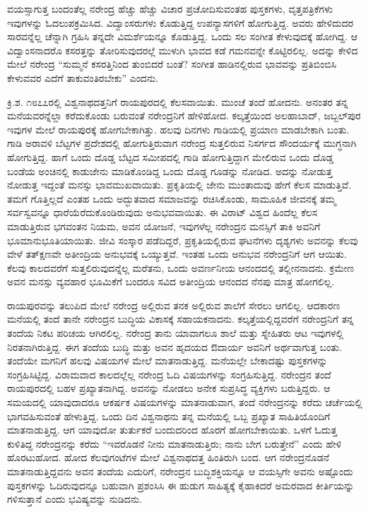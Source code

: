 ವಯಸ್ಸಾಗುತ್ತ ಬಂದಂತೆಲ್ಲ ನರೇಂದ್ರ ಹೆಚ್ಚು ಹೆಚ್ಚು ವಿಚಾರ ಪ್ರಚೋದಿಸುವಂತಹ ಪುಸ್ತಕಗಳು, ವೃತ್ತಪತ್ರಿಕೆಗಳು ಇವುಗಳನ್ನು ಓದಲುಪಕ್ರಮಿಸಿದ. ವಿದ್ವಾಂಸರುಗಳು ಕೊಡುತ್ತಿದ್ದ ಉಪನ್ಯಾಸಗಳಿಗೆ ಹೋಗುತ್ತಿದ್ದ. ಅವರು ಹೇಳಿದುದರ ಸಾರವನ್ನೆಲ್ಲ ಚೆನ್ನಾಗಿ ಗ್ರಹಿಸಿ ತನ್ನದೇ ವಿಮರ್ಶೆಯನ್ನೂ ಕೊಡುತ್ತಿದ್ದ. ಒಂದು ಸಲ ಸಂಗೀತ ಕೇಳುವುದಕ್ಕೆ ಹೋಗಿದ್ದ. ಆ ವಿದ್ವಾಂಸನಾದರೊ ಕಸರತ್ತನ್ನು ತೋರಿಸುವುದರಲ್ಲೆ ಮುಳುಗಿ ಭಾವದ ಕಡೆ ಗಮನವನ್ನೇ ಕೊಟ್ಟಿರಲಿಲ್ಲ. ಅದನ್ನು ಕೇಳಿದ ಮೇಲೆ ನರೇಂದ್ರ “ಸುಮ್ಮನೆ ಕಸರತ್ತಿನಿಂದ ತುಂಬಿದರೆ ಬಂತೆ? ಸಂಗೀತ ಹಾಡಿನಲ್ಲಿರುವ ಭಾವವನ್ನು ಪ್ರತಿಬಿಂಬಿಸಿ ಕೇಳುವವರ ಎದೆಗೆ ತಾಕುವಂತಿರಬೇಕು” ಎಂದನು.

ಕ್ರಿ.ಶ. ೧೮೭೭ರಲ್ಲಿ ವಿಶ್ವನಾಥದತ್ತನಿಗೆ ರಾಯಪುರದಲ್ಲಿ ಕೆಲಸವಾಯಿತು. ಮುಂಚೆ ತಂದೆ ಹೋದನು. ಅನಂತರ ತನ್ನ ಮನೆಯವರನ್ನೆಲ್ಲಾ ಕರೆದುಕೊಂಡು ಬರುವಂತೆ ನರೇಂದ್ರನಿಗೆ ಹೇಳಿಹೋದ. ಕಲ್ಕತ್ತೆಯಿಂದ ಅಲಹಾಬಾದ್, ಜಬ್ಬಲ್‍ಪುರ ಇವುಗಳ ಮೇಲೆ ರಾಯಪುರಕ್ಕೆ ಹೋಗಬೇಕಾಗಿತ್ತು. ಹಲವು ದಿನಗಳು ಗಾಡಿಯಲ್ಲಿ ಪ್ರಯಾಣ ಮಾಡಬೇಕಾಗಿ ಬಂತು. ಗಾಡಿ ಅರಾವಳಿ ಬೆಟ್ಟಗಳ ಪ್ರದೇಶದಲ್ಲಿ ಹೋಗುತ್ತಿರುವಾಗ ನರೇಂದ್ರ ಸುತ್ತಲಿರುವ ನಿಸರ್ಗದ ಸೌಂದರ್ಯಕ್ಕೆ ಮುಗ್ಧನಾಗಿ ಹೋಗುತ್ತಿದ್ದ. ಹಾಗೆ ಒಂದು ದೊಡ್ಡ ಬೆಟ್ಟದ ಸಮೀಪದಲ್ಲಿ ಗಾಡಿ ಹೋಗುತ್ತಿದ್ದಾಗ ಮೇಲಿರುವ ಒಂದು ದೊಡ್ಡ ಬಂಡೆಯ ಅಂಚಿನಲ್ಲಿ ಕಾಡುಜೇನು ಮಾಡಿಕೊಂಡಿದ್ದ ಒಂದು ದೊಡ್ಡ ಗೂಡನ್ನು ನೋಡಿದ. ಅದನ್ನು ನೋಡುತ್ತ ನೋಡುತ್ತ ಇದ್ದಂತೆ ಮನಸ್ಸು ಭಾವಮುಖವಾಯಿತು. ಪ್ರಕೃತಿಯಲ್ಲಿ ಜೇನು ಮುಂತಾದುವು ಹೇಗೆ ಕೆಲಸ ಮಾಡುತ್ತಿವೆ. ತಮಗೆ ಗೊತ್ತಿಲ್ಲದೆ ಎಂತಹ ಒಂದು ಅದ್ಭುತವಾದ ಸಮಾಜವನ್ನು ರಚಿಸಿಕೊಂಡು, ಸಾಮೂಹಿಕ ಜೀವನಕ್ಕೆ ತಮ್ಮ ಸರ್ವಸ್ವವನ್ನೂ ಧಾರೆಯೆರೆದುಕೊಂಡಿರುವುದು ಅನುಭವವಾಯಿತು. ಈ ವಿರಾಟ್ ವಿಶ್ವದ ಹಿಂದೆಲ್ಲ ಕೆಲಸ ಮಾಡುತ್ತಿರುವ ಭಗವಂತನ ನಿಯಮ, ಅವನ ಯೋಜನೆ, ಇವುಗಳೆಲ್ಲ ನರೇಂದ್ರನ ಮನಸ್ಸಿಗೆ ತಾಕಿ ಅವನಿಗೆ ಭೂಮಾನುಭೂತಿಯಾಯಿತು. ಜೀವಿ ಸಂಸ್ಕಾರ ಪಡೆದಿದ್ದರೆ, ಪ್ರಕೃತಿಯಲ್ಲಿರುವ ಘಟನೆಗಳು ದೃಶ್ಯಗಳು ಅವನನ್ನು ಕೆಲವು ವೇಳೆ ತತ್‍ಕ್ಷಣವೇ ಅತೀಂದ್ರಿಯ ಅನುಭವಕ್ಕೆ ಒಯ್ಯುತ್ತವೆ. ಇಂತಹ ಒಂದು ಅನುಭವ ನರೇಂದ್ರನಿಗೆ ಆಗ ಆಯಿತು. ಕೆಲವು ಕಾಲದವರೆಗೆ ಸುತ್ತಲಿರುವುದನ್ನೆಲ್ಲ ಮರೆತನು, ಒಂದು ಅವರ್ಣನೀಯ ಆನಂದದಲ್ಲಿ ತಲ್ಲೀನನಾದನು. ಕ್ರಮೇಣ ಅವನ ಮನಸ್ಸು ವ್ಯವಹಾರ ಭೂಮಿಕೆಗೆ ಬಂದರೂ ಸವಿದ ಅತೀಂದ್ರಿಯ ಆನಂದದ ನೆನಪು ಮಾತ್ರ ಹೋಗಲಿಲ್ಲ.

ರಾಯಪುರವನ್ನು ತಲುಪಿದ ಮೇಲೆ ನರೇಂದ್ರ ಅಲ್ಲಿರುವ ತನಕ ಅಲ್ಲಿರುವ ಶಾಲೆಗೆ ಸೇರಲು ಆಗಲಿಲ್ಲ. ಆದಕಾರಣ ಮನೆಯಲ್ಲಿ ತಂದೆ ತಾನೇ ನರೇಂದ್ರನ ಬುದ್ಧಿಯ ವಿಕಾಸಕ್ಕೆ ಸಹಾಯಕನಾದನು. ಕಲ್ಕತ್ತೆಯಲ್ಲಿದ್ದವರೆಗೆ ನರೇಂದ್ರನಿಗೆ ತನ್ನ ತಂದೆಯ ನಿಕಟ ಪರಿಚಯ ಆಗಿರಲಿಲ್ಲ. ನರೇಂದ್ರ ತಾನು ಯಾವಾಗಲೂ ಶಾಲೆ ಮತ್ತು ಸ್ನೇಹಿತರು ಆಟ ಇವುಗಳಲ್ಲಿ ನಿರತನಾಗಿರುತ್ತಿದ್ದ. ಈಗ ತಂದೆಯ ಬುದ್ಧಿ ಮತ್ತು ಅವನ ಹೃದಯದ ಔದಾರ್ಯ ಅವನಿಗೆ ಅರ್ಥವಾಗುತ್ತ ಬಂತು. ತಂದೆಯೇ ಮಗನಿಗೆ ಹಲವು ವಿಷಯಗಳ ಮೇಲೆ ಮಾತನಾಡುತ್ತಿದ್ದ. ಮನೆಯಲ್ಲೇ ಬೇಕಾದಷ್ಟು ಪುಸ್ತಕಗಳನ್ನು ಸಂಗ್ರಹಿಸಿಟ್ಟಿದ್ದ. ವಿರಾಮವಾದ ಕಾಲದಲ್ಲೆಲ್ಲ ನರೇಂದ್ರ ಓದಿ ವಿಷಯಗಳನ್ನು ಸಂಗ್ರಹಿಸುತ್ತಿದ್ದ. ನರೇಂದ್ರನ ತಂದೆ ರಾಯಪುರದಲ್ಲಿ ಬಹಳ ಪ್ರಖ್ಯಾತನಾಗಿದ್ದ. ಅವನನ್ನು ನೋಡಲು ಅನೇಕ ಸುಪ್ರಸಿದ್ಧ ವ್ಯಕ್ತಿಗಳು ಬರುತ್ತಿದ್ದರು. ಆ ಸಮಯದಲ್ಲಿ ಯಾವುದಾದರೂ ಆಕರ್ಷಕ ವಿಷಯಗಳನ್ನು ಮಾತನಾಡುವಾಗ, ತಂದೆ ನರೇಂದ್ರನನ್ನು ಕರೆದು ಚರ್ಚೆಯಲ್ಲಿ ಭಾಗವಹಿಸುವಂತೆ ಹೇಳುತ್ತಿದ್ದ. ಒಂದು ದಿನ ವಿಶ್ವನಾಥನು ತನ್ನ ಮನೆಯಲ್ಲಿ ಒಬ್ಬ ಪ್ರಖ್ಯಾತ ಸಾಹಿತಿಯೊಂದಿಗೆ ಮಾತನಾಡುತ್ತಿದ್ದ. ಆಗ ಯಾವುದೋ ತುರ್ತುಕರೆ ಬಂದುದರಿಂದ ಹೊರಗೆ ಹೋಗಬೇಕಾಯಿತು. ಒಳಗೆ ಓದುತ್ತ ಕುಳಿತಿದ್ದ ನರೇಂದ್ರನನ್ನು ಕರೆದು “ಇವರೊಡನೆ ನೀನು ಮಾತನಾಡುತ್ತಿರು; ನಾನು ಬೇಗ ಬರುತ್ತೇನೆ” ಎಂದು ಹೇಳಿ ಹೊರಟುಹೋದ. ಹೋದ ಕೆಲವುಗಂಟೆಗಳ ಮೇಲೆ ವಿಶ್ವನಾಥದತ್ತ ಹಿಂತಿರುಗಿ ಬಂದ. ಆಗ ನರೇಂದ್ರನೊಡನೆ ಮಾತನಾಡುತ್ತಿದ್ದವನು ಅವನ ತಂದೆಯ ಎದುರಿಗೆ, ನರೇಂದ್ರನ ಬುದ್ಧಿಶಕ್ತಿಯನ್ನೂ ಆ ವಯಸ್ಸಿಗೇ ಅವನು ಅಷ್ಟೊಂದು ಪುಸ್ತಕಗಳನ್ನು ಓದಿರುವುದನ್ನೂ ಬಹುವಾಗಿ ಪ್ರಶಂಸಿಸಿ ಈ ಹುಡುಗ ಸಾಹಿತ್ಯಕ್ಕೆ ಕೈಹಾಕಿದರೆ ಅಮರವಾದ ಕೀರ್ತಿಯನ್ನು ಗಳಿಸುತ್ತಾನೆ ಎಂದು ಭವಿಷ್ಯವನ್ನು ನುಡಿದನು.

